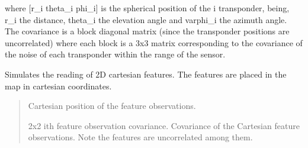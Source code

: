 \documentclass[letterpaper,10pt,english]{sphinxmanual}
\begin{document}
\begin{fulllineitems}
\begin{fulllineitems}
\begin{quote}
\begin{description}
\end{description}\end{quote}

\sphinxAtStartPar
where {[}r\_i theta\_i phi\_i{]} is the spherical position of the i transponder, being, r\_i the distance, theta\_i the
elevation angle and varphi\_i the azimuth angle. The covariance is a block diagonal matrix (since the transponder
positions are uncorrelated) where each block is a 3x3 matrix corresponding to the covariance of the noise of each
transponder within the range of the sensor.

\end{fulllineitems}


\begin{fulllineitems}
\label{\detokenize{robot_simulation:AUV4DOFSimulatedRobot.AUV4DOFSimulatedRobot.ReadCartesian2DFeature}}
\pysigstartsignatures
{}
\pysigstopsignatures
\sphinxAtStartPar
Simulates the reading of 2D cartesian features. The features are placed in the map in cartesian coordinates.
\begin{quote}\begin{description}
\sphinxAtStartPar
\begin{description}
\sphinxAtStartPar
Cartesian position of the feature observations.

\sphinxAtStartPar
2x2 i\sphinxhyphen{}th feature observation covariance.
Covariance of the Cartesian feature observations. Note the features are uncorrelated among them.

\end{description}


\end{description}\end{quote}

\end{fulllineitems}



\end{fulllineitems}
\end{document}
